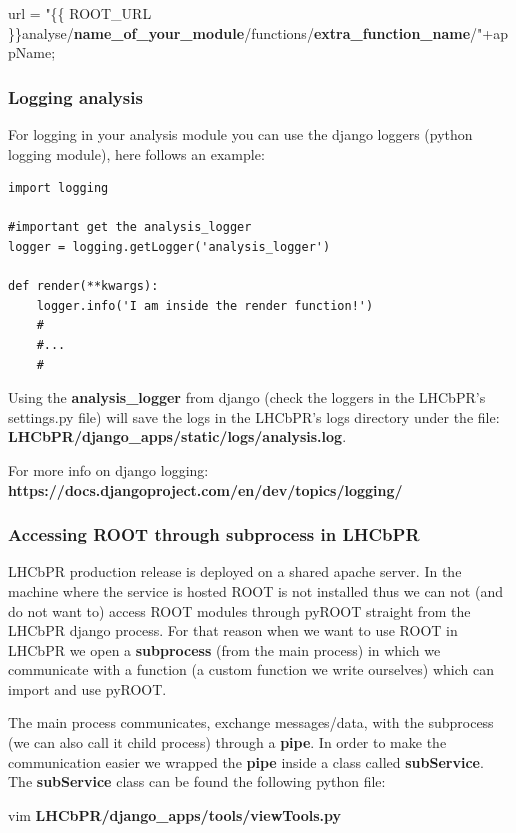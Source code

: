 \documentclass{lhcbnote}
\begin{document}
url = "\{\{ ROOT\_URL \}\}analyse/{\bf name\_of\_your\_module}/functions/{\bf extra\_function\_name}/"+appName;

\subsubsection{Logging analysis}

For logging in your analysis module you can use the django loggers (python logging module), here follows an example:

\begin{verbatim}
import logging

#important get the analysis_logger
logger = logging.getLogger('analysis_logger')

def render(**kwargs):
    logger.info('I am inside the render function!')
    #
    #...
    #
\end{verbatim}

Using the {\bf analysis\_logger} from django (check the loggers in the LHCbPR's settings.py file) will save the logs in the LHCbPR's logs directory under the file: {\bf LHCbPR/django\_apps/static/logs/analysis.log}.

For more info on django logging:  {\bf https://docs.djangoproject.com/en/dev/topics/logging/}

\subsubsection{Accessing ROOT through subprocess in LHCbPR}

LHCbPR production release is deployed on a shared apache server. In the machine where the service is hosted ROOT is not installed thus we can not (and do not want to) access ROOT modules through pyROOT straight from the LHCbPR django process. For that reason when we want to use ROOT in LHCbPR we open a \textbf{subprocess} (from the main process) in which we communicate with a function (a custom function we write ourselves) which can import and use  pyROOT. 

The main process communicates, exchange messages/data, with the subprocess (we can also call it child process) through a \textbf{pipe}. In order to make the communication easier we wrapped the \textbf{pipe} inside a class called \textbf{subService}. The \textbf{subService} class can be found the following python file:

vim \textbf{LHCbPR/django\_apps/tools/viewTools.py}

\vspace{2 mm}
\end{document}
